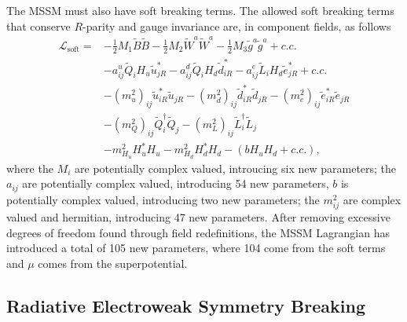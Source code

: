\documentclass[twoside,english]{uiofysmaster}
\begin{document}
{The MSSM must also have soft breaking terms. The allowed soft breaking terms that conserve $R$-parity and gauge invariance are, in component fields, as follows
\begin{align}\label{Eq:: phys back : MSSM soft terms}
\mathcal{L}_{\text{soft}} =& - \frac{1}{2} M_1 \widetilde{B} \widetilde{B} - \frac{1}{2} M_2 \widetilde{W}^a \widetilde{W}^a - \frac{1}{2} M_3 \widetilde{g}^a \widetilde{g}^a + c.c. \nonumber \\
&- a_{ij}^u \widetilde{Q}_i H_u \widetilde{u}_{jR}^* - a_{ij}^d \widetilde{Q}_i H_d \widetilde{d}_{iR}^* - a_{ij}^e \widetilde{L}_i H_d \widetilde{e}_{jR}^* + c.c. \nonumber \\
& -(m_u^2)_{ij} \widetilde{u}_{iR}^* \widetilde{u}_{jR} - (m_d^2)_{ij} \widetilde{d}_{iR}^* \widetilde{d}_{jR} - (m_e^2)_{ij} \widetilde{e}_{iR}^* \widetilde{e}_{jR} \nonumber \\
& - (m_Q^2)_{ij} \widetilde{Q}_i^{\dagger} \widetilde{Q}_j - (m_L^2)_{ij} \widetilde{L}_i^{\dagger} \widetilde{L}_j \nonumber \\
& - m_{H_u}^2 H_u^*H_u - m_{H_d}^2 H_d^* H_d - (b H_u H_d + c.c.),
\end{align}
where the $M_i$ are potentially complex valued, introucing six new parameters; the $a_{ij}$ are potentially complex valued, introducing 54 new parameters, $b$ is potentially complex valued, introducing two new parameters; the $m_{ij}^2$ are complex valued and hermitian, introducing 47 new parameters. After removing excessive degrees of freedom found through field redefinitions, the MSSM Lagrangian has introduced a total of 105 new parameters, where 104 come from the soft terms and $\mu$ comes from the superpotential.


\subsection{Radiative Electroweak Symmetry Breaking}

}
\end{document}
